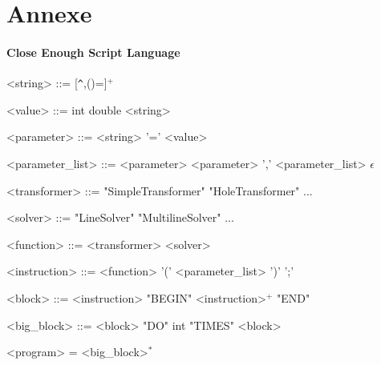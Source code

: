 \section{Annexe}

\paragraph{Close Enough Script Language\\}

\setlength{\grammarparsep}{20pt plus 1pt minus 1pt} %
\setlength{\grammarindent}{12em} %
\begin{grammar}
<string> ::= [\verb|^|,()=]$^+$

<value> ::= int \alt double \alt <string>

<parameter> ::= <string> '=' <value>

<parameter\_list> ::= <parameter> \alt <parameter> ',' <parameter\_list> \alt $\epsilon$

<transformer> ::= "SimpleTransformer" \alt "HoleTransformer" \alt ...

<solver> ::= "LineSolver" \alt "MultilineSolver" \alt ...

<function> ::= <transformer> \alt <solver>

<instruction> ::= <function> '(' <parameter\_list> ')' ';'

<block> ::= <instruction> \alt "BEGIN" <instruction>$^+$ "END"

<big\_block> ::= <block> \alt "DO" int "TIMES" <block>

<program> = <big\_block>$^*$
\end{grammar}